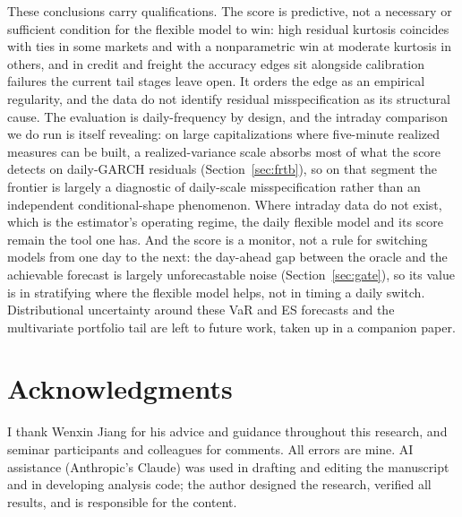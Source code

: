 \documentclass[11pt]{article}
\theoremstyle{remark}
\begin{document}
These conclusions carry qualifications. The score is predictive, not a
necessary or sufficient condition for the flexible model to win: high residual
kurtosis coincides with ties in some markets and with a nonparametric win at
moderate kurtosis in others, and in credit and freight the accuracy edges sit
alongside calibration failures the current tail stages leave open. It orders
the edge as an empirical regularity, and the data do not identify residual
misspecification as its structural cause. The evaluation is daily-frequency by
design, and the intraday comparison we do run is itself revealing: on large
capitalizations where five-minute realized measures can be built, a
realized-variance scale absorbs most of what the score detects on daily-GARCH
residuals (Section~\ref{sec:frtb}), so on that segment the frontier is largely a
diagnostic of daily-scale misspecification rather than an independent
conditional-shape phenomenon. Where intraday data do not exist, which is the
estimator's operating regime, the daily flexible model and its score remain the
tool one has. And the score is a monitor, not a rule for switching models from
one day to the next: the day-ahead gap between the oracle and the achievable
forecast is largely unforecastable noise (Section~\ref{sec:gate}), so its value
is in stratifying where the flexible model helps, not in timing a daily switch.
Distributional uncertainty around these VaR and ES forecasts and the
multivariate portfolio tail are left to future work, taken up in a
companion paper.

\section*{Acknowledgments}
I thank Wenxin Jiang for his advice and guidance throughout this
research, and seminar participants and colleagues for comments. All
errors are mine.
AI assistance (Anthropic's Claude) was used in drafting and editing
the manuscript and in developing analysis code; the author designed
the research, verified all results, and is responsible for the
content.
\end{document}
